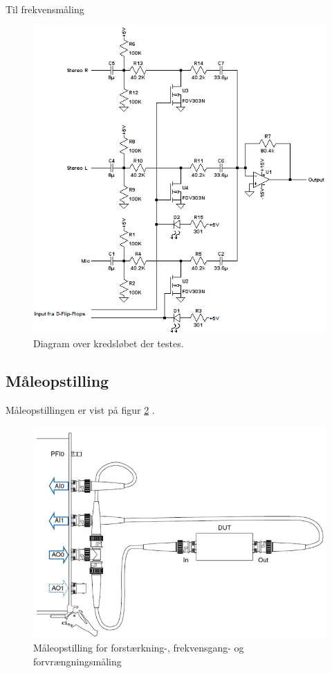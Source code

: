 Til frekvensmåling 
\begin{figure}[h]
\centering
\includegraphics[scale=0.8]{maalerapporter/indgangsvaelger/indgangvaelger_ltspice_diagram.png}
\caption{Diagram over kredsløbet der testes.}
\label{maalerap_diagram_simulering}
\end{figure}

\subsection*{Måleopstilling}
Måleopstillingen er vist på figur \ref{fig:indgang:maaleop-thd} .

\begin{figure}[h]
\centering
\includegraphics[scale=0.4]{maalerapporter/indgangsvaelger/maaleopstilling-thd-forforstaerker.png}
\caption{Måleopstilling for forstærkning-, frekvensgang- og forvrængningsmåling}
\label{fig:indgang:maaleop-thd}
\end{figure}


